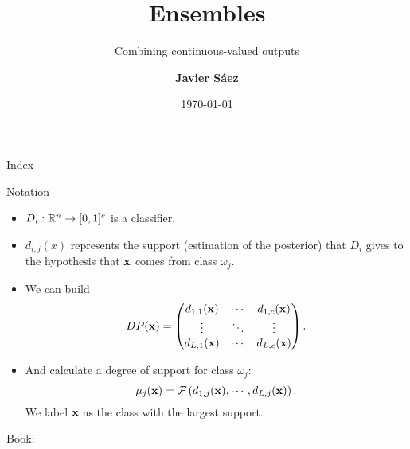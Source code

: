 \documentclass[xcolor=table]{beamer}
\begin{document}
\title{Ensembles}
\subtitle{Combining continuous-valued outputs}
\author[Javier Sáez]{\textbf {Javier Sáez}} %
\date{\today}

\begin{frame}
    \maketitle
\end{frame}

\begin{frame}{Index}
    \tableofcontents
\end{frame}


    
\begin{frame}{Notation}
\begin{itemize}
    \item \(D_i: {\mathbb R}^n \to [0,1]^c\) is a classifier.
    \item \(d_{i,j}(x)\) represents the support (estimation of the posterior) that \(D_i\) gives to the hypothesis that \({\mathbf x}\) comes from class \(\omega_j\).
    \item We can build
    \[
    DP({\mathbf x}) = \begin{pmatrix}
        d_{1,1}({\mathbf x}) & \cdots & d_{1,c}({\mathbf x})\\
        \vdots & \ddots & \vdots \\
        d_{L,1}({\mathbf x}) & \cdots & d_{L,c}({\mathbf x})
    \end{pmatrix}.
    \]
    \item And calculate a degree of support for class \(\omega_j\):
    \[
    \mathbf{\mu}_j({\mathbf x}) = \mathbf{\mathcal F}\left(d_{1,j}({\mathbf x}),\cdots, d_{L,j}({\mathbf x})\right).
    \]
    We label \({\mathbf x}\) as the class with the largest support.
\end{itemize}

\vspace{1cm}
Book: 
    \cite{10.5555/2935490}
\end{frame}



\end{document}
